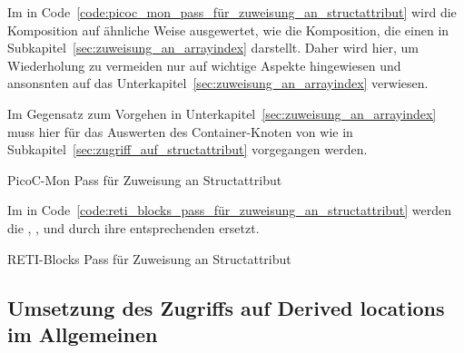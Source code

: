 Im  in Code~\ref{code:picoc_mon_pass_für_zuweisung_an_structattribut} wird die Komposition  auf ähnliche Weise ausgewertet, wie die Komposition, die einen   in Subkapitel~\ref{sec:zuweisung_an_arrayindex} darstellt. Daher wird hier, um Wiederholung zu vermeiden nur auf wichtige Aspekte hingewiesen und ansonsnten auf das Unterkapitel~\ref{sec:zuweisung_an_arrayindex} verwiesen.

Im Gegensatz zum Vorgehen in Unterkapitel~\ref{sec:zuweisung_an_arrayindex} muss hier für das Auswerten des  Container-Knoten  von  wie in Subkapitel~\ref{sec:zugriff_auf_structattribut} vorgegangen werden.

\begin{code}
  \centering
  \caption{PicoC-Mon Pass für Zuweisung an Structattribut}
  \label{code:picoc_mon_pass_für_zuweisung_an_structattribut}
\end{code}

Im  in Code~\ref{code:reti_blocks_pass_für_zuweisung_an_structattribut} werden die  , ,  und  durch ihre entsprechenden  ersetzt.

\begin{code}
  \centering
  \caption{RETI-Blocks Pass für Zuweisung an Structattribut}
  \label{code:reti_blocks_pass_für_zuweisung_an_structattribut}
\end{code}

\subsection{Umsetzung des Zugriffs auf Derived locations im Allgemeinen}

